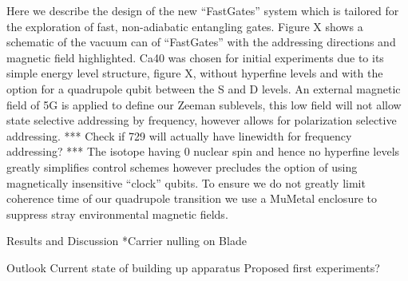 \subtitle{FastGates Apparatus}

Here we describe the design of the new ``FastGates'' system which is
tailored for the exploration of fast, non-adiabatic entangling
gates. Figure X shows a schematic of the vacuum can of ``FastGates''
with the addressing directions and magnetic field highlighted. Ca40
was chosen for initial experiments due to its simple energy level
structure, figure X, without hyperfine levels and with the option for
a quadrupole qubit between the S and D levels. An external magnetic
field of 5G is applied to define our Zeeman sublevels, this low field
will not allow state selective addressing by frequency, however allows
for polarization selective addressing. *** Check if 729 will actually
have linewidth for frequency addressing? *** The isotope having 0
nuclear spin and hence no hyperfine levels greatly simplifies control
schemes however precludes the option of using magnetically insensitive
``clock'' qubits. To ensure we do not greatly limit coherence time of
our quadrupole transition we use a MuMetal enclosure to suppress stray
environmental magnetic fields.



Results and Discussion
    *Carrier nulling on Blade

Outlook
    Current state of building up apparatus
    Proposed first experiments?

  

